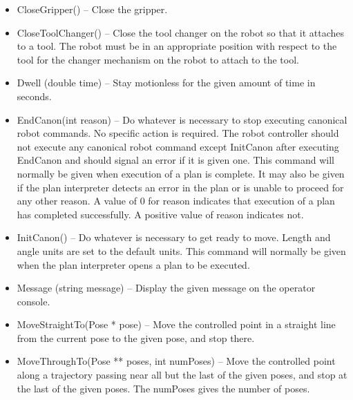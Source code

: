 \begin{itemize}

\item \sf CloseGripper() \rm -- Close the gripper.\\

\item \sf CloseToolChanger() \rm -- Close the tool changer on the robot so
  that it attaches to a tool. The robot must be in an appropriate position
  with respect to the tool for the changer mechanism on the robot to attach
  to the tool.\\

\item \sf Dwell (double time) \rm -- Stay motionless for the given amount
  of \sf time \rm in seconds.\\

\item \sf EndCanon(int reason) \rm -- Do whatever is necessary to stop
  executing canonical robot commands. No specific action is required. The
  robot controller should not execute any canonical robot command except
  \sf InitCanon \rm after executing \sf EndCanon \rm and should signal an
  error if it is given one.  This command will normally be given when
  execution of a plan is complete.  It may also be given if the plan
  interpreter detects an error in the plan or is unable to proceed for any
  other reason. A value of 0 for \sf reason \rm indicates that execution of
  a plan has completed successfully.  A positive value of reason indicates
  not.\\

\item \sf InitCanon() \rm -- Do whatever is necessary to get ready to
  move. Length and angle units are set to the default units. This command
  will normally be given when the plan interpreter opens a plan to be
  executed.\\

\item \sf Message (string message) \rm -- Display the given \sf message \rm
  on the operator console.\\

\item \sf MoveStraightTo(Pose * pose) \rm -- Move the controlled point in a
  straight line from the current pose to the given \sf pose\rm, and stop
  there.\\

\item \sf MoveThroughTo(Pose ** poses, int numPoses) \rm -- Move the
  controlled point along a trajectory passing near all but the last of the
  given \sf poses\rm, and stop at the last of the given \sf poses\rm.
  The \sf numPoses \rm gives the number of poses.\\


\end{itemize}

